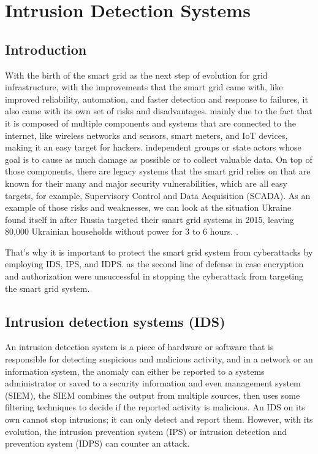 \chapter{Intrusion Detection Systems} \label{chap:Intrusion Detection Systems}


\section*{Introduction}
With the birth of the smart grid as the next step of evolution for grid infrastructure, with the improvements that the smart grid came with, like improved reliability, automation, and faster detection and response to failures, it also came with its own set of risks and disadvantages. mainly due to the fact that it is composed of multiple components and systems that are connected to the internet, like wireless networks and sensors, smart meters, and IoT devices, making it an easy target for hackers. independent groups or state actors whose goal is to cause as much damage as possible or to collect valuable data. On top of those components, there are legacy systems that the smart grid relies on that are known for their many and major security vulnerabilities, which are all easy targets, for example, Supervisory Control and Data Acquisition (SCADA). As an example of those risks and weaknesses, we can look at the situation Ukraine found itself in after Russia targeted their smart grid systems in 2015, leaving 80,000 Ukrainian households without power for 3 to 6 hours. \cite{ukrain-sg-attack}.

That's why it is important to protect the smart grid system from cyberattacks by employing IDS, IPS, and IDPS. 
as the second line of defense in case encryption and authorization were unsuccessful in stopping the cyberattack from targeting the smart grid system.

\newpage




\section{Intrusion detection systems (IDS)}
An intrusion detection system is a piece of hardware or software that is responsible for detecting suspicious and malicious activity, and in a network or an information system, the anomaly can either be reported to a systems administrator or saved to a security information and even management system (SIEM), the SIEM combines the output from multiple sources, then uses some filtering techniques to decide if the reported activity is malicious. \cite{ids-def}
An IDS on its own cannot stop intrusions; it can only detect and report them. However, with its evolution, the intrusion prevention system (IPS) or intrusion detection and prevention system (IDPS) can counter an attack. \cite{ibm-ids}








